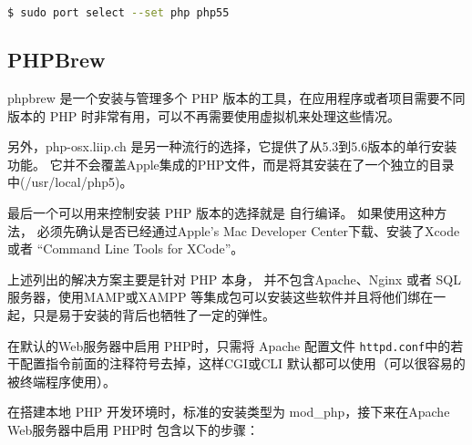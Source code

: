 \begin{lstlisting}[language=bash]
$ sudo port select --set php php55
\end{lstlisting}

\subsection{PHPBrew}

phpbrew 是一个安装与管理多个 PHP 版本的工具，在应用程序或者项目需要不同版本的 PHP 时非常有用，可以不再需要使用虚拟机来处理这些情况。

另外，php-osx.liip.ch 是另一种流行的选择，它提供了从5.3到5.6版本的单行安装功能。 它并不会覆盖Apple集成的PHP文件，而是将其安装在了一个独立的目录中(/usr/local/php5)。


最后一个可以用来控制安装 PHP 版本的选择就是 自行编译。 如果使用这种方法， 必须先确认是否已经通过Apple’s Mac Developer Center下载、安装了Xcode 或者 “Command Line Tools for XCode”。

上述列出的解决方案主要是针对 PHP 本身， 并不包含Apache、Nginx 或者 SQL 服务器，使用MAMP或XAMPP 等集成包可以安装这些软件并且将他们绑在一起，只是易于安装的背后也牺牲了一定的弹性。




在默认的Web服务器中启用 PHP时，只需将 Apache 配置文件 \texttt{httpd.conf}中的若干配置指令前面的注释符号去掉，这样CGI或CLI 默认都可以使用（可以很容易的被终端程序使用）。


在搭建本地 PHP 开发环境时，标准的安装类型为 mod\_php，接下来在Apache Web服务器中启用 PHP时 包含以下的步骤：

